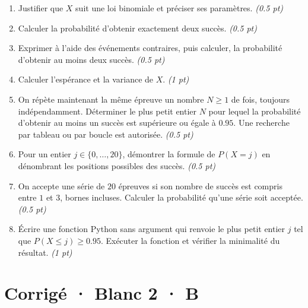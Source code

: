 \begin{enumerate}

\item Justifier que $X$ suit une loi binomiale et préciser ses paramètres. \hfill\textit{(\num{0,5} pt)}

\item Calculer la probabilité d'obtenir exactement deux succès. \hfill\textit{(\num{0,5} pt)}

\item Exprimer à l'aide des événements contraires, puis calculer, la probabilité d'obtenir au moins deux succès. \hfill\textit{(\num{0,5} pt)}

\item Calculer l'espérance et la variance de $X$. \hfill\textit{(1 pt)}

\item On répète maintenant la même épreuve un nombre $N\ge1$ de fois, toujours indépendamment. Déterminer le plus petit entier $N$ pour lequel la probabilité d'obtenir au moins un succès est supérieure ou égale à $\num{0,95}$. Une recherche par tableau ou par boucle est autorisée. \hfill\textit{(\num{0,5} pt)}

\item Pour un entier $j\in\{0,\ldots,20\}$, démontrer la formule de $P(X=j)$ en dénombrant les positions possibles des succès. \hfill\textit{(\num{0,5} pt)}

\item On accepte une série de $20$ épreuves si son nombre de succès est compris entre $1$ et $3$, bornes incluses. Calculer la probabilité qu'une série soit acceptée. \hfill\textit{(\num{0,5} pt)}

\item Écrire une fonction Python sans argument qui renvoie le plus petit entier $j$ tel que $P(X\le j)\ge\num{0,95}$. Exécuter la fonction et vérifier la minimalité du résultat. \hfill\textit{(1 pt)}

\end{enumerate}

\ifmxteacher\mxnewpage

\section*{Corrigé · Blanc 2 · B}\label{cor:8-4}

